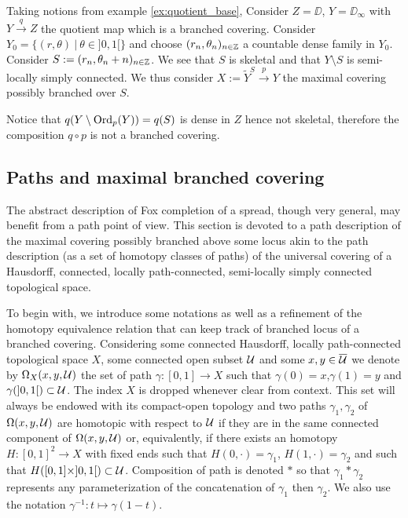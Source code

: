 \begin{cex}\label{cex:proposition_prop_branched_covering}

Taking notions from example \ref{ex:quotient_base},  Consider $Z=\DD$, $Y=\DD_\infty$ with $Y\xrightarrow{q} Z$ the quotient map which is a branched covering. Consider $Y_0 = \{(r,\theta) ~|~ \theta \in ]0,1[\}$ and choose $(r_n,\theta_n)_{n\in \mathbb{Z}}$ a countable dense family in $Y_0$. Consider $S := (r_n,\theta_n+n)_{n\in \mathbb{Z}}$. We see that $S$ is skeletal and that $Y\setminus S$ is semi-locally simply connected. We thus consider $X:= \widetilde Y^{S} \xrightarrow{p} Y$ the maximal covering possibly branched over $S$. 

Notice that $q(Y\setminus \mathrm{Ord}_p(Y)) = q(S)$ is dense in $Z$ hence not skeletal, therefore the composition $q\circ p$ is not a branched covering. 
\end{cex}


\subsection{Paths and maximal branched covering}\label{sec:maximal_branched_path}
The abstract description of Fox completion of a spread, though very general,
may benefit from a path point of view.
This section is devoted to a path description 
of the maximal covering possibly branched above some locus akin to 
the path description (as a set of homotopy classes of paths)
of the universal covering of a Hausdorff, connected, locally path-connected,
semi-locally simply connected topological space. 

To begin with, we introduce some notations as well as a refinement of the
homotopy equivalence relation that can keep track of branched locus of a branched covering.
Considering some connected Hausdorff, locally path-connected topological space $X$, 
some connected open subset $\mathcal{U}$ and some $x,y\in \overline{\mathcal{U}}$ we denote by
$\Omega_X(x,y,\mathcal{U})$ the set of path $\gamma:[0,1]\rightarrow X$ such that
$\gamma(0)=x$,$\gamma(1)=y$ and $\gamma(]0,1[)\subset \mathcal{U}$. The index $X$ is dropped whenever clear from context. 
This set will always be endowed with its compact-open topology and two paths 
$\gamma_1,\gamma_2$ of $\Omega(x,y,\mathcal{U})$ are homotopic with respect to $\mathcal{U}$ if they are in the same connected component of $\Omega(x,y,\mathcal{U})$ or, equivalently, if there exists an homotopy $H:[0,1]^2\rightarrow X$ with fixed ends such that $H(0,\cdot)=\gamma_1$, $H(1,\cdot)=\gamma_2$ and such that $H([0,1]\times ]0,1[)\subset \mathcal{U}$. 
Composition of path is denoted $*$ so that $\gamma_1*\gamma_2$ represents any parameterization of the concatenation of $\gamma_1$ then $\gamma_2$. We also use the notation ${\gamma}^{-1}:t\mapsto \gamma(1-t)$.

